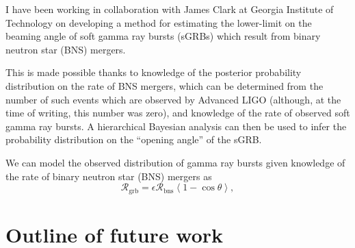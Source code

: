 \documentclass[openleft]{kentigern}
\theoremstyle{definition}
\begin{document}
I have been working in collaboration with James Clark at Georgia
Institute of Technology on developing a method for estimating the
lower-limit on the beaming angle of soft gamma ray bursts (sGRBs)
which result from binary neutron star (BNS) mergers.

This is made possible thanks to knowledge of the posterior probability
distribution on the rate of BNS mergers, which can be determined from
the number of such events which are observed by Advanced LIGO
(although, at the time of writing, this number was zero), and
knowledge of the rate of observed soft gamma ray bursts. A
hierarchical Bayesian analysis can then be used to infer the
probability distribution on the ``opening angle'' of the sGRB.

We can model the observed distribution of gamma ray bursts given
knowledge of the rate of binary neutron star (BNS) mergers as
\begin{equation}
  \label{eq:grb-rate}
  \mathcal{R}_{\mathrm{grb}} = \epsilon \mathcal{R}_{\mathrm{bns}} \left\langle 1 - \cos\theta \right\rangle,
\end{equation}

%
% 





\chapter{Outline of future work}
\label{part:future}

\backmatter






%

\glsaddall
{}
\printglossaries
\end{document}

